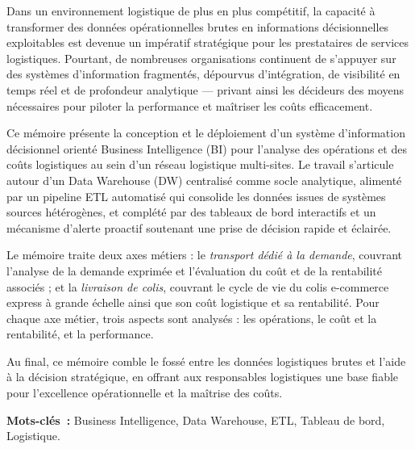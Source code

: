 
Dans un environnement logistique de plus en plus compétitif, la capacité à transformer des
données opérationnelles brutes en informations décisionnelles exploitables est devenue un
impératif stratégique pour les prestataires de services logistiques. Pourtant, de nombreuses
organisations continuent de s'appuyer sur des systèmes d'information fragmentés, dépourvus
d'intégration, de visibilité en temps réel et de profondeur analytique --- privant ainsi les
décideurs des moyens nécessaires pour piloter la performance et maîtriser les coûts efficacement.

Ce mémoire présente la conception et le déploiement d'un système d'information décisionnel
orienté Business Intelligence (BI) pour l'analyse des opérations et des coûts logistiques au sein
d'un réseau logistique multi-sites. Le travail s'articule autour d'un Data Warehouse (DW)
centralisé comme socle analytique, alimenté par un pipeline ETL automatisé qui consolide les
données issues de systèmes sources hétérogènes, et complété par des tableaux de bord interactifs
et un mécanisme d'alerte proactif soutenant une prise de décision rapide et éclairée.

Le mémoire traite deux axes métiers : le \emph{transport dédié à la demande}, couvrant l'analyse
de la demande exprimée et l'évaluation du coût et de la rentabilité associés ; et la \emph{livraison
de colis}, couvrant le cycle de vie du colis e-commerce express à grande échelle ainsi que son
coût logistique et sa rentabilité. Pour chaque axe métier, trois aspects sont analysés : les
opérations, le coût et la rentabilité, et la performance.

Au final, ce mémoire comble le fossé entre les données logistiques brutes et l'aide à la décision
stratégique, en offrant aux responsables logistiques une base fiable pour l'excellence
opérationnelle et la maîtrise des coûts.

\bigskip
\vspace{0.5cm}

\noindent\textbf{Mots-clés~:} Business Intelligence, Data Warehouse, ETL, Tableau de bord,
Logistique.
